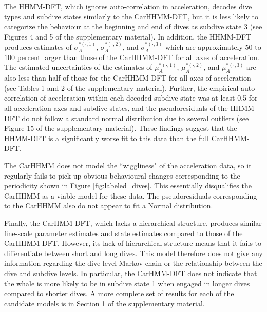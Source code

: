 The HHMM-DFT, which ignores auto-correlation in acceleration, decodes dive types and subdive states similarly to the CarHHMM-DFT, but it is less likely to categorize the behaviour at the beginning and end of dives as subdive state 3 (see Figures 4 and 5 of the supplementary material). In addition, the HHMM-DFT produces estimates of $\sigma_A^{*(\cdot,1)}$, $\sigma_A^{*(\cdot,2)}$, and $\sigma_A^{*(\cdot,3)}$ which are approximately $50$ to $100$ percent larger than those of the CarHHMM-DFT for all axes of acceleration. The estimated uncertainties of the estimates of $\mu_A^{*(\cdot,1)}$, $\mu_A^{*(\cdot,2)}$, and $\mu_A^{*(\cdot,3)}$ are also less than half of those for the CarHHMM-DFT for all axes of acceleration (see Tables 1 and 2 of the supplementary material). Further, the empirical auto-correlation of acceleration within each decoded subdive state was at least 0.5 for all acceleration axes and subdive states, and the pseudoresiduals of the HHMM-DFT do not follow a standard normal distribution due to several outliers (see Figure 15 of the supplementary material). These findings suggest that the HHMM-DFT is a significantly worse fit to this data than the full CarHHMM-DFT.

The CarHHMM does not model the ``wiggliness" of the acceleration data, so it regularly fails to pick up obvious behavioural changes corresponding to the periodicity shown in Figure \ref{fig:labeled_dives}. This essentially disqualifies the CarHHMM as a viable model for these data. The pseudoresiduals corresponding to the CarHHMM also do not appear to fit a Normal distribution.

Finally, the CarHMM-DFT, which lacks a hierarchical structure, produces similar fine-scale parameter estimates and state estimates compared to those of the CarHHMM-DFT. However, its lack of hierarchical structure means that it fails to differentiate between short and long dives. This model therefore does not give any information regarding the dive-level Markov chain or the relationship between the dive and subdive levels. In particular, the CarHMM-DFT does not indicate that the whale is more likely to be in subdive state 1 when engaged in longer dives compared to shorter dives. A more complete set of results for each of the candidate models is in Section 1 of the supplementary material.